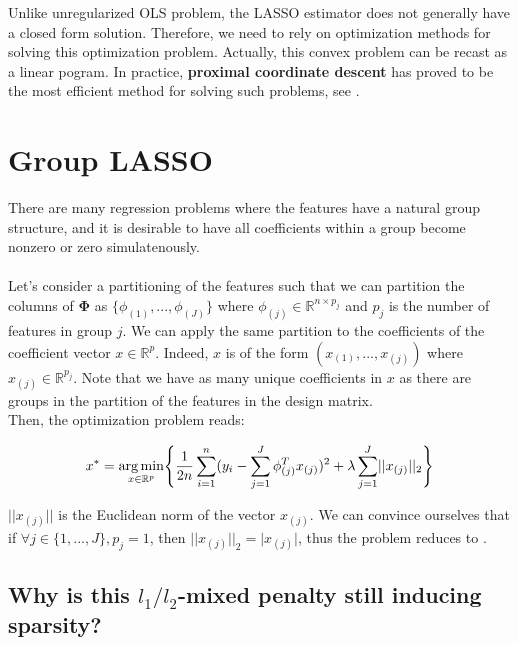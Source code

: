 \documentclass[a4paper,10pt]{article}
\theoremstyle{definition}
\begin{document}
Unlike unregularized OLS problem, the LASSO estimator does not generally have a closed form solution. Therefore, we need to rely on optimization methods for solving this optimization problem. Actually, this convex problem
can be recast as a linear pogram. In practice, \textbf{proximal coordinate descent} has proved to be the most efficient method for solving such problems, see \cite{Bertrand_Massias_Anderson}.

\section{Group LASSO}
\label{section_2}

There are many regression problems where the features have a natural group structure, and it is desirable to have all coefficients within a group become nonzero or zero simulatenously.
\\
\\
Let's consider a partitioning of the features such that we can partition the columns of $\mathbf{\Phi}$ as $\{\phi_{(1)}, ..., \phi_{(J)}\}$ where $\phi_{(j)} \in \mathbb{R}^{n \times p_j}$ and
$p_j$ is the number of features in group $j$. We can apply the same partition to the coefficients of the coefficient vector $x \in \mathbb{R}^p$. Indeed, $x$ is of the form $(x_{(1)}, ..., x_{(j)})$ where
$x_{(j)} \in \mathbb{R}^{p_j}$. Note that we have as many unique coefficients in $x$ as there are groups in the partition of the features in the design matrix.
\\

Then, the optimization problem reads:

\begin{equation*}
    x^* = \operatorname*{arg\,min}_{x \in \mathbb{R}^p} \Biggl\{ \frac{1}{2n} \sum_{i=1}^n (y_i - \sum_{j=1}^J \phi_{(j)}^T x_{(j)})^2 + \lambda \sum_{j=1}^{J} \lvert\lvert x_{(j)} \rvert\rvert_2 \Biggr\}
\end{equation*}

$\lvert\lvert x_{(j)} \rvert\rvert$ is the Euclidean norm of the vector $x_{(j)}$. We can convince ourselves that if $\forall j \in \{1, ..., J\}, p_j = 1$, then $\lvert\lvert x_{(j)} \rvert\rvert_2 = \lvert x_{(j)} \rvert$, 
thus the problem reduces to .

\subsection*{Why is this $l_1 / l_2$-mixed penalty still inducing sparsity?}
\end{document}
